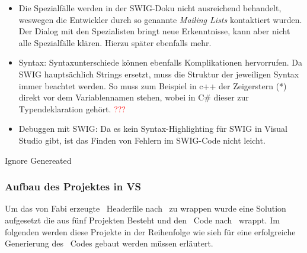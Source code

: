 \begin{itemize}
\begin{itemize}
	\end{itemize}
\item Die Spezialfälle werden in der SWIG-Doku nicht ausreichend behandelt, weswegen die Entwickler durch so genannte \emph{Mailing Lists} kontaktiert wurden. Der Dialog mit den Spezialisten bringt neue Erkenntnisse, kann aber nicht alle Spezialfälle klären. Hierzu später ebenfalls mehr.
\item Syntax: Syntaxunterschiede können ebenfalls Komplikationen hervorrufen. Da SWIG hauptsächlich Strings ersetzt, muss die Struktur der jeweiligen Syntax immer beachtet werden. So muss zum Beispiel in c++ der Zeigerstern (*) direkt vor dem Variablennamen stehen, wobei in C\# dieser zur Typendeklaration gehört. \textcolor{red}{???}
\item Debuggen mit SWIG: Da es kein Syntax-Highlighting für SWIG in Visual Studio gibt, ist das Finden von Fehlern im SWIG-Code nicht leicht.  
\end{itemize}



	
	
		


	Ignore Genereated\\


\subsubsection{Aufbau des Projektes in VS}\label{subsubsec:Aufbau}

Um das von Fabi erzeugte \CC~Headerfile nach \CS~zu wrappen wurde eine Solution aufgesetzt die aus fünf Projekten Besteht und den \CC~Code nach \CS~wrappt. Im folgenden werden diese Projekte in der Reihenfolge wie sieh für eine erfolgreiche Generierung des \CS~Codes gebaut werden müssen erläutert.\\



